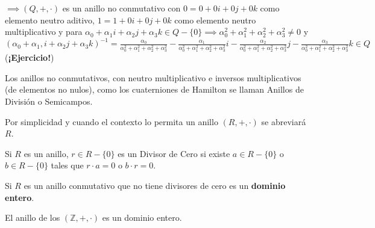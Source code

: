 \begin{ejemplo}
\begin{enumerate}
\begin{enumerate}
        \end{enumerate}
        $\implies (Q,+,\cdot)$ es un anillo no conmutativo con $0=0+0i+0j+0k$ como elemento neutro aditivo, $1=1+0i+0j+0k$ como elemento neutro multiplicativo y para $\alpha_0+\alpha_1i+\alpha_2j+\alpha_3k\in Q-\{0\}\implies \alpha_0^2+\alpha_1^2+\alpha_2^2+\alpha_3^2\neq 0$ y $(\alpha_0+\alpha_1,i+\alpha_2j+\alpha_3k)^{-1}= \frac{\alpha_0}{\alpha_0^2+\alpha_1^2+\alpha_2^2+\alpha_3^2}-\frac{\alpha_1}{\alpha_0^2+\alpha_1^2+\alpha_2^2+\alpha_3^2}i-\frac{\alpha_2}{\alpha_0^2+\alpha_1^2+\alpha_2^2+\alpha_3^2}j-\frac{\alpha_3}{\alpha_0^2+\alpha_1^2+\alpha_2^2+\alpha_3^2}k\in Q$ (\textbf{¡Ejercicio!})
    \end{enumerate}
    Los anillos no conmutativos, con neutro multiplicativo e inversos multiplicativos (de elementos no nulos), como los cuaterniones de Hamilton se llaman Anillos de División o Semicampos.
\end{ejemplo}

\begin{nota}
    Por simplicidad y cuando el contexto lo permita un anillo $(R,+,\cdot)$ se abreviará $R$.
\end{nota}

\begin{definicion}
    Si $R$ es un anillo, $r\in R-\{0\}$ es un Divisor de Cero si existe $a\in R-\{0\}$ o $b\in R-\{0\}$ tales que $r\cdot a=0$ o $b\cdot r=0$.
\end{definicion}


\begin{definicion}
    Si $R$ es un anillo conmutativo que no tiene divisores de cero es un \textbf{dominio entero}. 
\end{definicion}

\begin{ejemplo}
    El anillo de los $(\mathbb{Z},+,\cdot)$ es un dominio entero. 
\end{ejemplo}